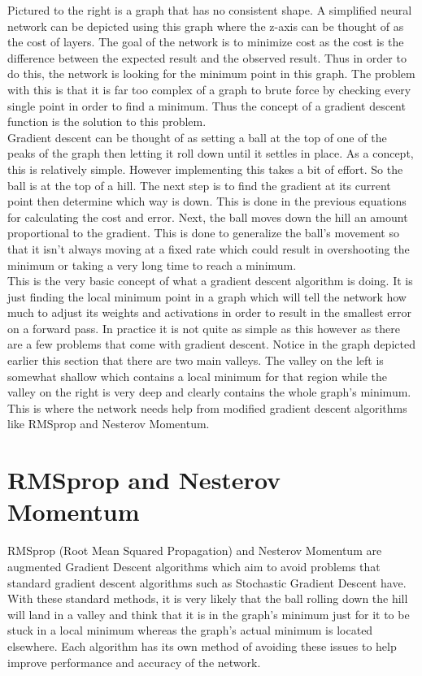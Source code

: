 \documentclass[12pt]{article}
\theoremstyle{definition}
\theoremstyle{plain}
\begin{document}
Pictured to the right is a graph that has no consistent shape. A simplified neural network can be depicted using this graph where the z-axis can be thought of as the cost of layers. The goal of the network is to minimize cost as the cost is the difference between the expected result and the observed result. Thus in order to do this, the network is looking for the minimum point in this graph. The problem with this is that it is far too complex of a graph to brute force by checking every single point in order to find a minimum. Thus the concept of a gradient descent function is the solution to this problem.\\

Gradient descent can be thought of as setting a ball at the top of one of the peaks of the graph then letting it roll down until it settles in place. As a concept, this is relatively simple. However implementing this takes a bit of effort. So the ball is at the top of a hill. The next step is to find the gradient at its current point then determine which way is down. This is done in the previous equations for calculating the cost and error. Next, the ball moves down the hill an amount proportional to the gradient. This is done to generalize the ball's movement so that it isn't always moving at a fixed rate which could result in overshooting the minimum or taking a very long time to reach a minimum.\\

This is the very basic concept of what a gradient descent algorithm is doing. It is just finding the local minimum point in a graph which will tell the network how much to adjust its weights and activations in order to result in the smallest error on a forward pass. In practice it is not quite as simple as this however as there are a few problems that come with gradient descent. Notice in the graph depicted earlier this section that there are two main valleys. The valley on the left is somewhat shallow which contains a local minimum for that region while the valley on the right is very deep and clearly contains the whole graph's minimum. This is where the network needs help from modified gradient descent algorithms like RMSprop and Nesterov Momentum.

\section*{RMSprop and Nesterov Momentum}
RMSprop (Root Mean Squared Propagation) and Nesterov Momentum are augmented Gradient Descent algorithms which aim to avoid problems that standard gradient descent algorithms such as Stochastic Gradient Descent have. With these standard methods, it is very likely that the ball rolling down the hill will land in a valley and think that it is in the graph's minimum just for it to be stuck in a local minimum whereas the graph's actual minimum is located elsewhere. Each algorithm has its own method of avoiding these issues to help improve performance and accuracy of the network.
\end{document}
